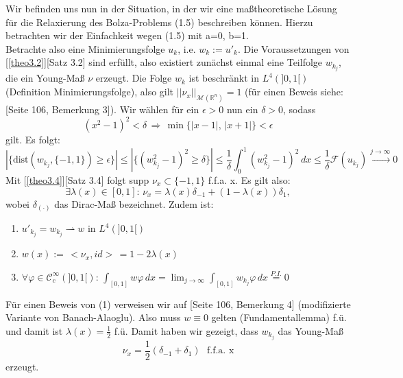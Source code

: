 Wir befinden uns nun in der Situation, in der wir eine maßtheoretische Lösung für die Relaxierung des Bolza-Problems (1.5) beschreiben können. Hierzu betrachten wir der Einfachkeit wegen (1.5) mit a=0, b=1.\\
Betrachte also eine Minimierungsfolge \(u_k\), i.e. \(w_k := u'_k\). Die Voraussetzungen von [\ref{theo3.2}][Satz 3.2] sind erfüllt, also existiert zunächst einmal eine Teilfolge \(w_{k_j}\), die ein Young-Maß \(\nu\) erzeugt. Die Folge \(w_k\) ist beschränkt in \(L^4(]0,1[)\) (Definition Minimierungsfolge), also gilt \(||\nu_x||_{\mathcal{M}(\mathbb{R}^n)} = 1\) (für einen Beweis siehe: \cite{CalcVarBSchmidt}[Seite 106, Bemerkung 3]). Wir wählen für ein \(\epsilon > 0\) nun ein \(\delta > 0\), sodass
\begin{equation}
    (x^2 - 1)^2 < \delta \, \Rightarrow \, \min \{|x-1|,\,|x+1|\} < \epsilon
\end{equation}
gilt. Es folgt:
\begin{equation}
    |\{\text{dist}(w_{k_j},\{-1,1\})\geq \epsilon\}| \le |\{(w^2_{k_j} - 1)^2 \geq \delta\}| \le \frac{1}{\delta} \int_{0}^1 (w^2_{k_j} - 1)^2 \, dx \le \frac{1}{\delta}\mathcal{F}(u_{k_j}) \stackrel{j \to \infty}{\to} 0
\end{equation}
Mit [\ref{theo3.4}][Satz 3.4] folgt supp \(\nu_x \subset \{-1,1\}\) f.f.a. x. Es gilt also:
\begin{equation}
    \exists \lambda(x) \in [0,1]:\,\nu_x = \lambda(x)\delta_{-1} + (1-\lambda(x))\delta_1,
\end{equation}
wobei \(\delta_{(\cdot)}\) das Dirac-Maß bezeichnet. Zudem ist:
\begin{enumerate}
    \item \(u'_{k_j} = w_{k_j} \rightharpoonup w\text{ in }L^4(]0,1[)\)
    \item \(w(x) := \,<\nu_x,id>\, = 1-2\lambda(x)\)
    \item \(\forall \varphi \in \mathcal{C}^{\infty}_c(]0,1[):\, \int_{[0,1]} w\varphi\,dx = \lim_{j \to \infty} \int_{[0,1]} w_{k_j} \varphi\,dx \stackrel{P.I.}{=} 0\)
\end{enumerate}
Für einen Beweis von (1) verweisen wir auf \cite{CalcVarBSchmidt}[Seite 106, Bemerkung 4] (modifizierte Variante von Banach-Alaoglu). Also muss \(w \equiv 0\) gelten (Fundamentallemma) f.ü. und damit ist \(\lambda(x) = \frac{1}{2}\) f.ü. Damit haben wir gezeigt, dass \(w_{k_j}\) das Young-Maß
\begin{equation}
    \nu_x = \frac{1}{2}(\delta_{-1} + \delta_1)\,\,\text{ f.f.a. x}
\end{equation}
erzeugt.\\

